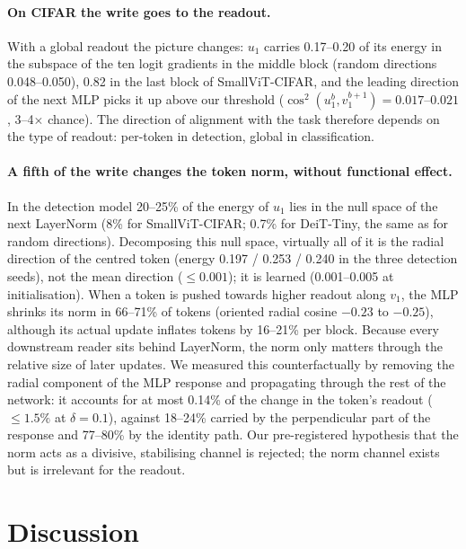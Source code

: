 \documentclass[10pt]{article}
\begin{document}
\paragraph{On CIFAR the write goes to the readout.} With a global readout the picture changes: $u_1$ carries 0.17--0.20 of its energy in the
subspace of the ten logit gradients in the middle block (random directions 0.048--0.050), 0.82 in the last block of SmallViT-CIFAR, and the
leading direction of the next MLP picks it up above our threshold ($\cos^2(u_1^b,v_1^{b+1})=0.017$--$0.021$, 3--4$\times$ chance). The
direction of alignment with the task therefore depends on the type of readout: per-token in detection, global in classification.

\paragraph{A fifth of the write changes the token norm, without functional effect.} In the detection model 20--25\% of the energy of $u_1$
lies in the null space of the next LayerNorm (8\% for SmallViT-CIFAR; 0.7\% for DeiT-Tiny, the same as for random directions). Decomposing this null space,
virtually all of it is the radial direction of the centred token (energy 0.197 / 0.253 / 0.240 in the three detection seeds), not the
mean direction ($\le0.001$); it is learned (0.001--0.005 at initialisation). When a token is pushed towards higher readout along $v_1$, the
MLP shrinks its norm in 66--71\% of tokens (oriented radial cosine $-0.23$ to $-0.25$), although its actual update inflates tokens by
16--21\% per block. Because every downstream reader sits behind LayerNorm, the norm only matters through the relative size of later updates.
We measured this counterfactually by removing the radial component of the MLP response and propagating through the rest of the network:
it accounts for at most 0.14\% of the change in the token's readout ($\le1.5\%$ at $\delta=0.1$), against 18--24\% carried by the
perpendicular part of the response and 77--80\% by the identity path. Our pre-registered hypothesis that the norm acts as a divisive,
stabilising channel \citep{carandini2012normalization} is rejected; the norm channel exists but is irrelevant for the readout.

\section{Discussion}
\label{sec:discussion}
\end{document}
